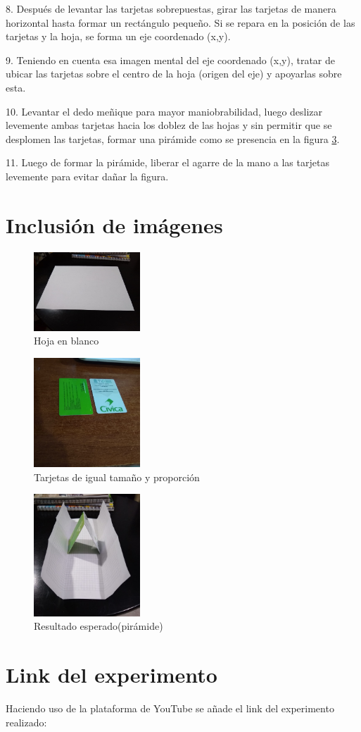 \documentclass{article}
\begin{document}
8. Después de levantar las tarjetas sobrepuestas, girar las tarjetas de manera horizontal hasta formar un rectángulo pequeño. Si se repara en la posición de las tarjetas y la hoja, se forma un eje coordenado (x,y).

9. Teniendo en cuenta esa imagen mental del eje coordenado (x,y), tratar de ubicar las tarjetas sobre el centro de la hoja (origen del eje) y apoyarlas sobre esta.

10. Levantar el dedo meñique para mayor maniobrabilidad, luego deslizar levemente ambas tarjetas hacia los doblez de las hojas y sin permitir que se desplomen las tarjetas, formar una pirámide como se presencia en la figura \ref{fig:Piramide}.

11. Luego de formar la pirámide, liberar el agarre de la mano a las tarjetas levemente para evitar dañar la figura.

\section{Inclusión de imágenes} \label{imagenes}
\begin{figure}[h]
\includegraphics[width=4cm]{Hoja.jpeg}
\centering
\caption{Hoja en blanco}
\label{fig:Hoja}
\end{figure}

\begin{figure}[h]
\includegraphics[width=4cm]{Tarjetas.jpeg}
\centering
\caption{Tarjetas de igual tamaño y proporción}
\label{fig:Tarjetas}
\end{figure}


\begin{figure}[h]
\includegraphics[width=4cm]{Piramide.jpeg}
\centering
\caption{Resultado esperado(pirámide)}
\label{fig:Piramide}
\end{figure}

\section{Link del experimento}
Haciendo uso de la plataforma de YouTube se añade el link del experimento realizado:
\end{document}
